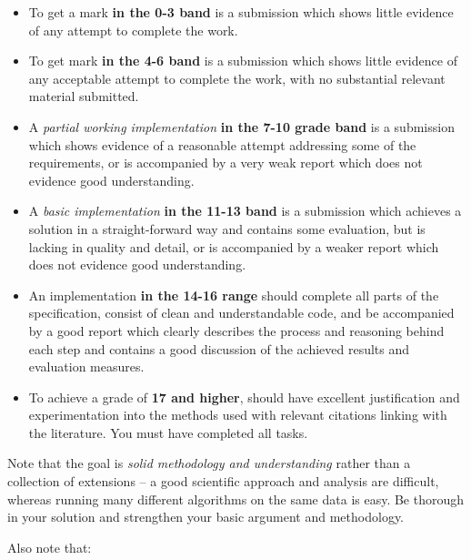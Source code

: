 \documentclass[a4paper,11pt]{article}
\begin{document}
\begin{itemize}

\item To get a mark \textbf{in the 0-3  band} is a submission which shows little evidence of any attempt to complete the work.
\item To get mark \textbf{in the 4-6 band} is a submission which shows little evidence of any acceptable attempt to complete the work, with no substantial relevant material submitted.
\item A \textit{partial working implementation} \textbf{in the 7-10 grade band} is a submission which shows evidence of a reasonable attempt addressing some of the requirements, or is accompanied by a very weak report which does not evidence good understanding.
\item A \textit{basic implementation} \textbf{in the 11-13 band} is a submission which achieves a solution in a straight-forward way and contains some evaluation, but is lacking in quality and detail, or is accompanied by a weaker report which does not evidence good understanding. 
\item An implementation \textbf{in the 14-16 range} should complete all parts of the specification, consist of clean and understandable code, and be accompanied by a good report which clearly describes the process and reasoning behind each step and contains a good discussion of the achieved results and evaluation measures. 
\item To achieve a grade of \textbf{17 and higher}, should have excellent justification and experimentation into the methods used with relevant citations linking with the literature. You must have completed all tasks.
\end{itemize}
Note that the goal is \emph{solid methodology and understanding} rather than 
a collection of extensions -- a good scientific approach and analysis are difficult, whereas running many different algorithms on the same data is easy. Be thorough in your solution and strengthen your basic argument and methodology. 

\noindent
Also note that:
\end{document}
